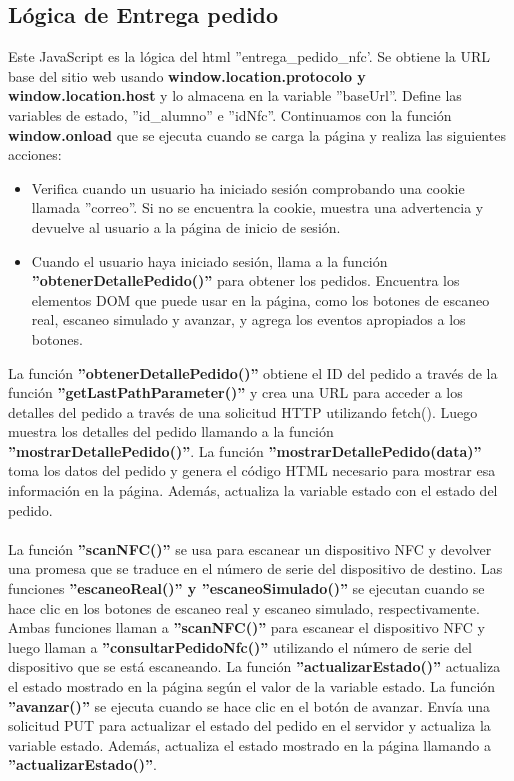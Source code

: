 \documentclass[12pt]{report}
\begin{document}
\subsection{Lógica de Entrega pedido}
Este JavaScript es la lógica del html ''entrega\_pedido\_nfc'. Se obtiene la URL base del sitio web usando \textbf{window.location.protocolo y window.location.host} y lo almacena en la variable ''baseUrl''.
Define las variables de estado, ''id\_alumno'' e ''idNfc''. Continuamos con la función \textbf{window.onload} que se ejecuta cuando se carga la página y realiza las siguientes acciones:
\begin{itemize}
    \item Verifica cuando un usuario ha iniciado sesión comprobando una cookie llamada ''correo''. Si no se encuentra la cookie, muestra una advertencia y devuelve al usuario a la página de inicio de sesión.
    \item Cuando el usuario haya iniciado sesión, llama a la función \textbf{''obtenerDetallePedido()''} para obtener los pedidos. Encuentra los elementos DOM que puede usar en la página, como los botones de escaneo real, escaneo simulado y avanzar, y agrega los eventos apropiados a los botones.
\end{itemize}
La función \textbf{''obtenerDetallePedido()''} obtiene el ID del pedido a través de la función \textbf{''getLastPathParameter()''} y crea una URL para acceder a los detalles del pedido a través de una solicitud HTTP utilizando fetch(). Luego muestra los detalles del pedido llamando a la función \textbf{''mostrarDetallePedido()''}.
La función \textbf{''mostrarDetallePedido(data)''} toma los datos del pedido y genera el código HTML necesario para mostrar esa información en la página. Además, actualiza la variable estado con el estado del pedido.
\\\\
La función \textbf{''scanNFC()''} se usa para escanear un dispositivo NFC y devolver una promesa que se traduce en el número de serie del dispositivo de destino.
Las funciones \textbf{''escaneoReal()'' y ''escaneoSimulado()''} se ejecutan cuando se hace clic en los botones de escaneo real y escaneo simulado, respectivamente. Ambas funciones llaman a \textbf{''scanNFC()''} para escanear el dispositivo NFC y luego llaman a \textbf{''consultarPedidoNfc()''} utilizando el número de serie del dispositivo que se está escaneando.
La función \textbf{''actualizarEstado()''} actualiza el estado mostrado en la página según el valor de la variable estado.
La función \textbf{''avanzar()''} se ejecuta cuando se hace clic en el botón de avanzar. Envía una solicitud PUT para actualizar el estado del pedido en el servidor y actualiza la variable estado. Además, actualiza el estado mostrado en la página llamando a \textbf{''actualizarEstado()''}.
\end{document}
